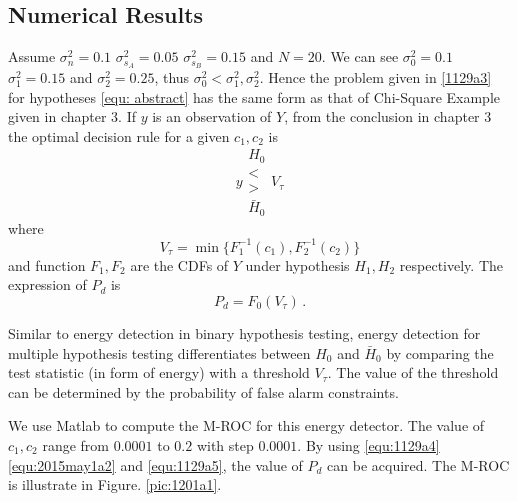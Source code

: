 \subsection{Numerical Results}
Assume $\sigma_n^2=0.1$ $\sigma_{s_A}^2=0.05$ $\sigma_{s_B}^2=0.15$ and $N=20$. We can see $\sigma_0^2=0.1$ $\sigma_1^2=0.15$ and $\sigma_2^2=0.25$, 
thus $\sigma_0^2 < \sigma_1^2, \sigma_2^2$. Hence the problem given in \eqref{1129a3} for hypotheses \eqref{equ: abstract} has the same form as that of Chi-Square Example given in chapter 3. 
If $y$ is an observation of $Y$, 
from the conclusion in chapter 3 the optimal  decision rule for a given $c_1, c_2$ is 
\begin{equation}
  y \substack{H_0 \\ < \\ > \\ \bar{H}_0} V_\tau
  \label{equ:1129a4}
\end{equation}
where 
\begin{equation}
  V_\tau = \min\{F_1^{-1}(c_1),  F_2^{-1}(c_2)\}
  \label{equ:2015may1a2}
\end{equation}
and function $F_1,  F_2$ are the CDFs of $Y$ under hypothesis $H_1, H_2$ respectively. The expression of $P_d$ is 
\begin{equation}
  P_d = F_0(V_\tau)\,.
  \label{equ:1129a5}
\end{equation}

Similar to energy detection in binary hypothesis testing, energy detection for multiple hypothesis testing differentiates between $H_0$ and $\bar{H}_0$ by comparing the test statistic (in form of energy) with a threshold $V_\tau$. The value of the threshold can be determined by the probability of false alarm constraints.   

We use Matlab to compute the M-ROC for this energy detector. The value of $c_1, c_2$ range from $0.0001$ to $0.2$ with step $0.0001$. By using \eqref{equ:1129a4} \eqref{equ:2015may1a2} and \eqref{equ:1129a5}, the value of $P_d$ can be acquired. The M-ROC is illustrate in Figure. \ref{pic:1201a1}. 

